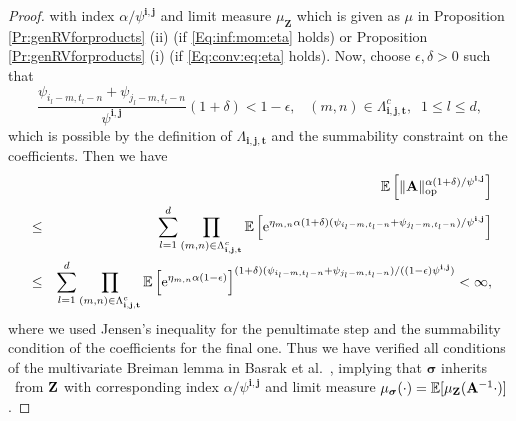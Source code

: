\begin{proof}
with index $\alpha/\psi^{\mathbf{i},\mathbf{j}}$ and limit measure $\mu_{\mathbf{Z}}$ which is given as $\mu$ in Proposition \ref{Pr:genRVforproducts} (ii) (if \eqref{Eq:inf:mom:eta} holds) or Proposition \ref{Pr:genRVforproducts} (i) (if \eqref{Eq:conv:eq:eta} holds). Now, choose $\epsilon, \delta>0$ such that
$$\frac{\psi_{i_l-m,t_l-n}+\psi_{j_l-m,t_l-n}}{\psi^{\mathbf{i},\mathbf{j}}}(1+\delta)<1-\epsilon, \;\;\;  (m,n) \in \Lambda_{\mathbf{i},\mathbf{j},\mathbf{t}}^c,\;\;1\leq l \leq d,$$
which is possible by the definition of $\Lambda_{\mathbf{i},\mathbf{j},\mathbf{t}}$ and the summability constraint on the coefficients. Then we have 
\begin{eqnarray*}&&{\mathbb E}\left[\|\mathbf{A}\|_{\mbox{\scriptsize op}}^{\alpha(1+\delta)/\psi^{\mathbf{i},\mathbf{j}}}\right]\\
&\leq & \sum_{l=1}^d \prod\limits_{(m,n) \in \Lambda_{\mathbf{i},\mathbf{j},\mathbf{t}}^c} {\mathbb E}\left[{\rm e}^{\eta_{m,n}\alpha(1+\delta)(\psi_{i_l-m,t_l-n}+\psi_{j_l-m,t_l-n})/\psi^{\mathbf{i},\mathbf{j}}}\right]\\
&\leq& \sum_{l=1}^d \prod\limits_{(m,n) \in \Lambda_{\mathbf{i},\mathbf{j},\mathbf{t}}^c} {\mathbb E}\left[{\rm e}^{\eta_{m,n}\alpha(1-\epsilon)}\right]^{(1+\delta)(\psi_{i_l-m,t_l-n}+\psi_{j_l-m,t_l-n})/((1-\epsilon)\psi^{\mathbf{i},\mathbf{j}})} <\infty,
\end{eqnarray*}
where we used Jensen's inequality for the penultimate step and the 
summability condition of the coefficients for the final one. Thus we have verified all conditions of the 
multivariate Breiman lemma in Basrak et al.~\cite{basrak:davis:mikosch:2002a}, implying that
$\boldsymbol{\sigma}$ inherits \regvar\  from ${\bf Z}$ with corresponding
index $\alpha/\psi^{\mathbf{i},\mathbf{j}}$ and limit measure
$\mu_{\boldsymbol{\sigma}}(\cdot)={\mathbb E}[\mu_{\mathbf{Z}}(\mathbf{A}^{-1}\cdot)]$.
\end{proof}
